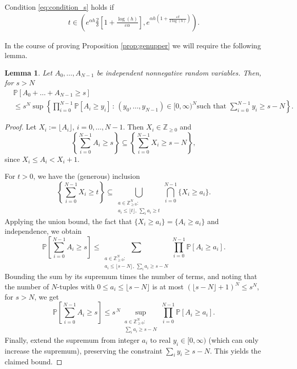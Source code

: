 \documentclass[a4,12pt]{amsart}
\numberwithin{equation}{section}
\newtheorem{lemma}[thm]{Lemma}
\begin{document}
Condition \eqref{eq:condition_s} holds if  
\begin{align*}
t\in \left(e^{\alpha h}\frac{2}{\delta}\left[1+\frac{\log(h)}{\varepsilon \alpha  }\right], e^{\alpha h(1+\tfrac{\varepsilon \delta}{2\log(h)})}  \right).
\end{align*}
    
	In the course of proving Proposition \ref{prop:genupper} we will require the following lemma.


    
	\begin{lemma} \label{lem:summa}
		Let $A_0,\ldots,A_{N-1}$ be independent nonnegative random variables. Then, for $s > N$
		\begin{align*} 
			&\mathbb{P}[A_0+\ldots+A_{N-1} \geq s] \nonumber \\
			&\leq s^N \sup \left\{ \prod_{i=0}^{N-1} \mathbb{P}[A_i \geq y_i ] \,:\, (y_0,\ldots,y_{N-1})\in[0,\infty)^N \mbox{such that }\sum_{i = 0}^{N-1}y_i \geq s- N \right\}.
			\end{align*}
	\end{lemma}
	
\begin{proof}
Let $X_i:=\lfloor A_i\rfloor$, $i=0,\dots,N-1$. Then $X_i\in\mathbb{Z}_{\ge0}$ and
\[
\left\{\sum_{i=0}^{N-1} A_i \ge s\right\}\subseteq
\left\{\sum_{i=0}^{N-1} X_i \ge s-N\right\},
\]
since $X_i\leq A_i<X_i+1$.

For $t >0 $, we have the (generous) inclusion
\[
\left\{\sum_{i=0}^{N-1} X_i \ge t\right\}
\subseteq
\bigcup_{\substack{a\in\mathbb{Z}_{\ge0}^N:\\ a_i\le \lfloor t\rfloor,\ \sum_i a_i \ge t}}
\bigcap_{i=0}^{N-1}\{X_i\ge a_i\}.
\]
Applying the union bound, the fact that 
$\{X_i\ge a_i\}=\{A_i\ge a_i\}$ and independence, we obtain
\[
	\mathbb{P}\!\left[\sum_{i=0}^{N-1} A_i \ge s\right]
\le
\sum_{\substack{a\in\mathbb{Z}_{\ge0}^N:\\ a_i\le \lfloor s-N\rfloor,\ \sum_i a_i \ge s-N}}
\prod_{i=0}^{N-1}\mathbb{P}[A_i\ge a_i].
\]
Bounding the sum by its supremum times the number of terms, and noting that the number of
$N$-tuples with $0\le a_i\le \lfloor s-N\rfloor$ is at most $(\lfloor s-N\rfloor+1)^N\le s^N$, 
for $s>N$, we get
\[
	\mathbb{P}\!\left[\sum_{i=0}^{N-1} A_i \ge s\right]
\le
s^{\,N}
\sup_{\substack{a\in\mathbb{Z}_{\ge0}^N:\\ \sum_i a_i \ge s-N}}
\prod_{i=0}^{N-1}\mathbb{P}[A_i\ge a_i].
\]
Finally, extend the supremum from integer $a_i$ to real $y_i\in[0,\infty)$ (which can only increase
the supremum), preserving the constraint $\sum_i y_i\ge s-N$. This yields the claimed bound.
\end{proof}
\end{document}
